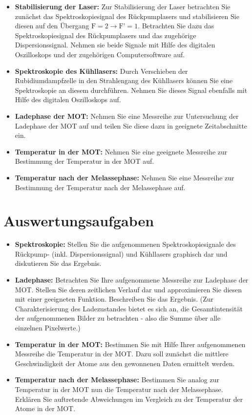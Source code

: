 \documentclass[
class=book,
accentcolor=1b,
custommargins=geometry,
fontsize=11pt,
thesis={type=Versuchsanleitung},
ruledheaders=all,
headline=false,
instbox=false,
marginpar=false,
title=small,
ignore-missing-data=true,
twoside=false,
logofile=apqdesign/tuda_logo.pdf,
pdfa=false %
]{apqpub}
\begin{document}
\begin{itemize}	
	\item \textbf{Stabilisierung der Laser:} Zur Stabilisierung der Laser betrachten Sie zunächst das Spektroskopiesignal des Rückpumplasers und stabilisieren Sie diesen auf den Übergang $\text{F}=2 \rightarrow \text{F'}=1$. 
Betrachten Sie dazu das Spektroskopiesignal des Rückpumplasers und das zugehörige Dispersionssignal.
Nehmen sie beide Signale mit Hilfe des digitalen Oszilloskops und der zugehörigen Computersoftware auf.
	
	\item \textbf{Spektroskopie des Kühllasers:} Durch Verschieben der Rubidiumdampfzelle in den Strahlengang des Kühllasers können Sie eine Spektroskopie an diesem durchführen. 
Nehmen Sie dieses Signal ebenfalls mit Hilfe des digitalen Oszilloskops auf.
	
	\item \textbf{Ladephase der MOT:} Nehmen Sie eine Messreihe zur Untersuchung der Ladephase der MOT auf und teilen Sie diese dazu in geeignete Zeitabschnitte ein.
	
	\item \textbf{Temperatur in der MOT:} Nehmen Sie eine geeignete Messreihe zur Bestimmung der Temperatur in der MOT auf.
	
	\item \textbf{Temperatur nach der Melassephase:} Nehmen Sie eine Messreihe zur Bestimmung der Temperatur nach der Melassephase auf.
\end{itemize}

\section{Auswertungsaufgaben}
\begin{itemize}
	\item \textbf{Spektroskopie:} Stellen Sie die aufgenommenen Spektroskopiesignale des Rückpump- (inkl. Dispersionssignal) und Kühllasers graphisch dar und diskutieren Sie das Ergebnis.
	
	\item \textbf{Ladephase:} Betrachten Sie Ihre aufgenommene Messreihe zur Ladephase der MOT. 
Stellen Sie deren zeitlichen Verlauf dar und approximieren Sie diesen mit einer geeigneten Funktion. 
Beschreiben Sie das Ergebnis.
(Zur Charakterisierung des Ladezustandes bietet es sich an, die Gesamtintensität der aufgenommenen Bilder zu betrachten - also die Summe über alle einzelnen Pixelwerte.)
	
	\item \textbf{Temperatur in der MOT:} Bestimmen Sie mit Hilfe Ihrer aufgenommenen Messreihe die Temperatur in der MOT. Dazu soll zunächst die mittlere Geschwindigkeit der Atome aus den gewonnenen Daten ermittelt werden. 
	
	\item \textbf{Temperatur nach der Melassephase:} Bestimmen Sie analog zur Temperatur in der MOT nun die Temperatur nach der Melassephase. 
Erklären Sie auftretende Abweichungen im Vergleich zu der Temperatur der Atome in der MOT.
\end{itemize}
\end{document}
